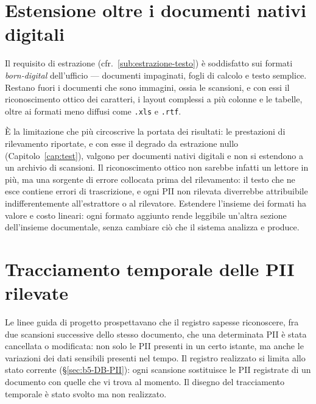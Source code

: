 \section{Estensione oltre i documenti nativi digitali}
\label{sec:sf-formati}

Il requisito di estrazione (cfr.~\ref{sub:estrazione-testo}) è soddisfatto sui formati \textit{born-digital} dell'ufficio --- documenti impaginati, fogli di calcolo e testo semplice. Restano fuori i documenti che sono immagini, ossia le scansioni, e con essi il riconoscimento ottico dei caratteri, i layout complessi a più colonne e le tabelle, oltre ai formati meno diffusi come \texttt{.xls} e \texttt{.rtf}.

È la limitazione che più circoscrive la portata dei risultati: le prestazioni di rilevamento riportate, e con esse il degrado da estrazione nullo (Capitolo~\ref{cap:test}), valgono per documenti nativi digitali e non si estendono a un archivio di scansioni. Il riconoscimento ottico non sarebbe infatti un lettore in più, ma una sorgente di errore collocata prima del rilevamento: il testo che ne esce contiene errori di trascrizione, e ogni PII non rilevata diverrebbe attribuibile indifferentemente all'estrattore o al rilevatore. Estendere l'insieme dei formati ha valore e costo lineari: ogni formato aggiunto rende leggibile un'altra sezione dell'insieme documentale, senza cambiare ciò che il sistema analizza e produce.

\section{Tracciamento temporale delle PII rilevate}
\label{sec:sf-tracciamento-temporale}

Le linee guida di progetto prospettavano che il registro sapesse riconoscere, fra due scansioni successive dello stesso documento, che una determinata PII è stata cancellata o modificata: non solo le PII presenti in un certo istante, ma anche le variazioni dei dati sensibili presenti nel tempo. Il registro realizzato si limita allo stato corrente (§\ref{sec:b5-DB-PII}): ogni scansione sostituisce le PII registrate di un documento con quelle che vi trova al momento. Il disegno del tracciamento temporale è stato svolto ma non realizzato.\medskip

